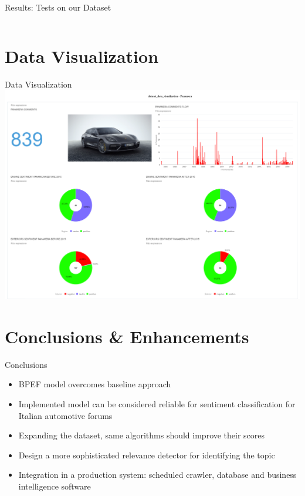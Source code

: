 \documentclass{beamer}
\begin{document}
\begin{frame}{Results: Tests on our Dataset}
{\begin{columns}
				
			\end{columns}
			
		}
		
	\end{frame}







	
	\section{Data Visualization}
	
	\begin{frame}{Data Visualization}
		\centering
		\vspace{-5mm}
		\includegraphics[width=\linewidth]{figures/dataset_data_visualization_2.pdf}

	\end{frame}









	\section{Conclusions \& Enhancements}
	
	\begin{frame}{Conclusions}
		
		\begin{itemize}
			\item BPEF model overcomes baseline approach
			\item Implemented model can be considered reliable for sentiment classification for Italian automotive forums
			\item Expanding the dataset, same algorithms should improve their scores
			\item Design a more sophisticated relevance detector for identifying the topic
			\item Integration in a production system: scheduled crawler, database and business intelligence software
		\end{itemize}

	\end{frame}
\end{document}
